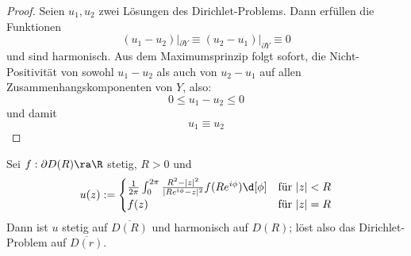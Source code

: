 \begin{proof}
  Seien $u_1, u_2$ zwei Lösungen des Dirichlet-Problems. Dann erfüllen
  die Funktionen
  \[
  (u_1 - u_2)|_{\partial Y} \equiv (u_2 - u_1)|_{\partial Y} \equiv 0
  \]
  und sind harmonisch. Aus dem Maximumsprinzip folgt sofort, die
  Nicht-Positivität von sowohl $u_1 - u_2$ als auch von $u_2 - u_1$
  auf allen Zusammenhangskomponenten von $Y$, also:
  \[
  0 \leq u_1 - u_2 \leq 0
  \]
  und damit
  \[
  u_1 \equiv u_2
  \]
\end{proof}

\begin{thm}
  \label{thm:poisson}
  Sei $f: \partial D(R) \ra \R$ stetig, $R > 0$ und
\begin{align*}
    u(z) :=
    \begin{cases}
      \frac{1}{2\pi} \int_0^{2\pi} \frac{R^2 - |z|^2}{|Re^{i\phi}
        - z|^2} f(R e^{i\phi}) \d[\phi] & \text{für } |z| < R\\
      f(z) & \text{für } |z| = R
    \end{cases}
  \end{align*}
  Dann ist $u$ stetig auf $\overline{D(R)}$ und harmonisch auf $D(R)$;
  löst also das Dirichlet-Problem auf $\overline{D(r)}$.
\end{thm}


